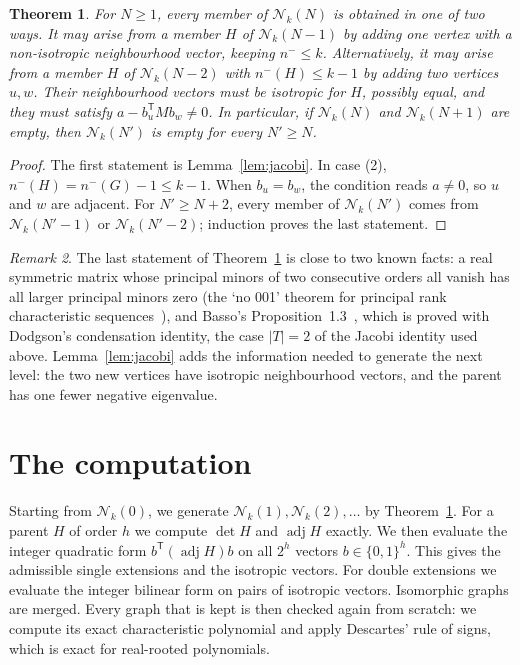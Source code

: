 \documentclass[11pt]{amsart}
\newtheorem{theorem}{Theorem}[section]
\theoremstyle{definition}
\theoremstyle{remark}
\newtheorem{remark}[theorem]{Remark}
\newcommand{\adj}{\operatorname{adj}}
\begin{document}
\begin{theorem}\label{thm:closure}
For $N\ge1$, every member of $\mathcal N_k(N)$ is obtained in one of two ways. It may arise from a member $H$ of $\mathcal N_k(N-1)$ by adding one vertex with a non-isotropic neighbourhood vector, keeping $n^-\le k$. Alternatively, it may arise from a member $H$ of $\mathcal N_k(N-2)$ with $n^-(H)\le k-1$ by adding two vertices $u,w$. Their neighbourhood vectors must be isotropic for $H$, possibly equal, and they must satisfy $a-b_u^{\mathsf T}Mb_w\ne0$. In particular, if $\mathcal N_k(N)$ and $\mathcal N_k(N+1)$ are empty, then $\mathcal N_k(N')$ is empty for every $N'\ge N$.
\end{theorem}

\begin{proof}
The first statement is Lemma~\ref{lem:jacobi}. In case (2), $n^-(H)=n^-(G)-1\le k-1$. When $b_u=b_w$, the condition reads $a\ne0$, so $u$ and $w$ are adjacent. For $N'\ge N+2$, every member of $\mathcal N_k(N')$ comes from $\mathcal N_k(N'-1)$ or $\mathcal N_k(N'-2)$; induction proves the last statement.
\end{proof}

\begin{remark}
The last statement of Theorem~\ref{thm:closure} is close to two known facts: a real symmetric matrix whose principal minors of two consecutive orders all vanish has all larger principal minors zero (the `no 001' theorem for principal rank characteristic sequences~\cite{BDOD2012}), and Basso's Proposition~1.3~\cite{Basso2021}, which is proved with Dodgson's condensation identity, the case $|T|=2$ of the Jacobi identity used above. Lemma~\ref{lem:jacobi} adds the information needed to generate the next level: the two new vertices have isotropic neighbourhood vectors, and the parent has one fewer negative eigenvalue.
\end{remark}

\section{The computation}\label{sec:computation}

Starting from $\mathcal N_k(0)$, we generate $\mathcal N_k(1),\mathcal N_k(2),\dots$ by Theorem~\ref{thm:closure}. For a parent $H$ of order $h$ we compute $\det H$ and $\adj H$ exactly. We then evaluate the integer quadratic form $b^{\mathsf T}(\adj H)b$ on all $2^h$ vectors $b\in\{0,1\}^h$. This gives the admissible single extensions and the isotropic vectors. For double extensions we evaluate the integer bilinear form on pairs of isotropic vectors. Isomorphic graphs are merged. Every graph that is kept is then checked again from scratch: we compute its exact characteristic polynomial and apply Descartes' rule of signs, which is exact for real-rooted polynomials.
\end{document}
